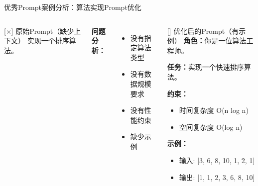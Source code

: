\begin{frame}{优秀Prompt案例分析：算法实现Prompt优化}
	\begin{columns}
		\begin{alertblock}{[×] 原始Prompt（缺少上下文）}
			实现一个排序算法。
		\end{alertblock}

		\vspace{0.3cm}

		\textbf{问题分析：}
		\begin{itemize}
			\item 没有指定算法类型
			\item 没有数据规模要求
			\item 没有性能约束
			\item 缺少示例
		\end{itemize}

		\begin{exampleblock}{[\checkmark] 优化后的Prompt（有示例）}
			\textbf{角色：}你是一位算法工程师。

			\vspace{0.2cm}

			\textbf{任务：}实现一个快速排序算法。

			\vspace{0.2cm}

			\textbf{约束：}
			\begin{itemize}
				\item 时间复杂度 O(n log n)
				\item 空间复杂度 O(log n)
			\end{itemize}

			\vspace{0.2cm}

			\textbf{示例：}
			\begin{itemize}
				\item 输入: [3, 6, 8, 10, 1, 2, 1]
				\item 输出: [1, 1, 2, 3, 6, 8, 10]
			\end{itemize}
		\end{exampleblock}
	\end{columns}
\end{frame}


